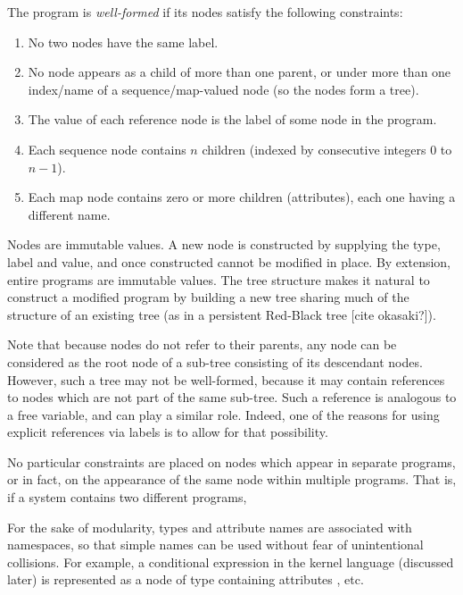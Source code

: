 The program is \emph{well-formed} if its nodes satisfy the following constraints:
\begin{enumerate}
\item No two nodes have the same label.
\item No node appears as a child of more than one parent, or under more than one index/name of a sequence/map-valued node (so the nodes form a tree).
\item The value of each reference node is the label of some node in the program.
\item Each sequence node contains $n$ children (indexed by consecutive integers $0$ to $n-1$).
\item Each map node contains zero or more children (attributes), each one having a different name.
\end{enumerate}


Nodes are immutable values. A new node is constructed by supplying the type, label and value, and once constructed cannot be modified in place. By extension, entire programs are immutable values. The tree structure makes it natural to construct a modified program by building a new tree sharing much of the structure of an existing tree (as in a persistent Red-Black tree [cite okasaki?]).

Note that because nodes do not refer to their parents, any node can be considered as the root node of a sub-tree consisting of its descendant nodes. However, such a tree may not be well-formed, because it may contain references to nodes which are not part of the same sub-tree. Such a reference is analogous to a free variable, and can play a similar role. Indeed, one of the reasons for using explicit references via labels is to allow for that possibility.

No particular constraints are placed on nodes which appear in separate programs, or in fact, on the appearance of the same node within multiple programs. That is, if a system contains two different programs, \todo{}

For the sake of modularity, types and attribute names are associated with namespaces, so that simple names can be used without fear of unintentional collisions. For example, a conditional expression in the kernel language (discussed later) is represented as a node of type  containing attributes , etc.

